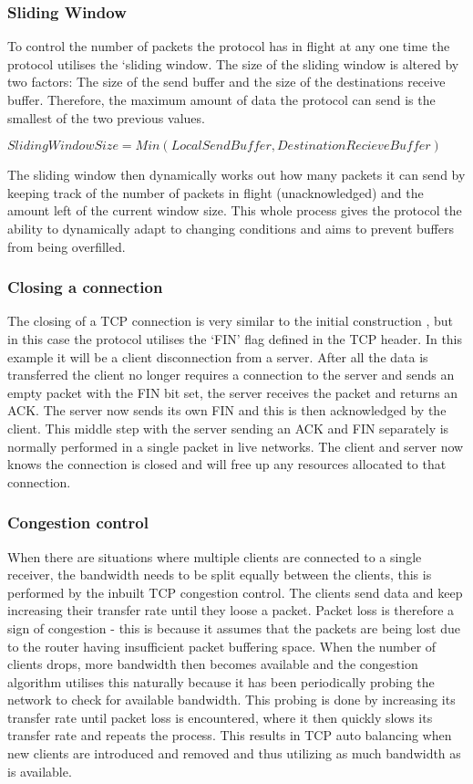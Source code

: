 \subsubsection*{Sliding Window}
To control the number of packets the protocol has in flight at any one time the protocol utilises the `sliding window. The size of the sliding window is altered by two factors: The size of the send buffer and the size of the destinations receive buffer. Therefore, the maximum amount of data the protocol can send is the smallest of the two previous values. 
\begin{center}
	$SlidingWindowSize = Min(LocalSendBuffer, DestinationRecieveBuffer)$
\end{center}
The sliding window then dynamically works out how many packets it can send by keeping track of the number of packets in flight (unacknowledged) and the amount left of the current window size. This whole process gives the protocol the ability to dynamically adapt to changing conditions and aims to prevent buffers from being overfilled.


\subsubsection*{Closing a connection}
The closing of a TCP connection is very similar to the initial construction \citep{TCP}, but in this case the protocol utilises the `FIN' flag defined in the TCP header. In this example it will be a client disconnection from a server. After all the data is transferred the client no longer requires a connection to the server and sends an empty packet with the FIN bit set, the server receives the packet and returns an ACK. The server now sends its own FIN and this is then acknowledged by the client. This middle step with the server sending an ACK and FIN separately is normally performed in a single packet in live networks. The client and server now knows the connection is closed and will free up any resources allocated to that connection.



\subsubsection*{Congestion control}
When there are situations where multiple clients are connected to a single receiver, the bandwidth needs to be split equally between the clients, this is performed by the inbuilt TCP congestion control. The clients send data and keep increasing their transfer rate until they loose a packet. Packet loss is therefore a sign of congestion - this is because it assumes that the packets are being lost due to the router having insufficient packet buffering space. When the number of clients drops, more bandwidth then becomes available and the congestion algorithm utilises this naturally because it has been periodically probing the network to check for available bandwidth. This probing is done by increasing its transfer rate until packet loss is encountered, where it then quickly slows its transfer rate and repeats the process. This results in TCP auto balancing when new clients are introduced and removed and thus utilizing as much bandwidth as is available.

